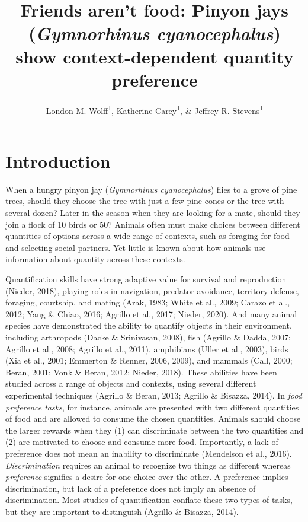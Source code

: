\documentclass[
  ,pub,floatsintext]{apa6}
\title{Friends aren't food: Pinyon jays (\emph{Gymnorhinus cyanocephalus}) show context-dependent quantity preference}
\author{London M. Wolff\textsuperscript{1}, Katherine Carey\textsuperscript{1}, \& Jeffrey R. Stevens\textsuperscript{1}}
\date{}
\affiliation{\vspace{0.5cm}\textsuperscript{1} Department of Psychology, Center for Brain, Biology \& Behavior, University of Nebraska-Lincoln, Lincoln, NE, USA}
\begin{document}
\maketitle

\hypertarget{introduction}{%
\section{Introduction}\label{introduction}}

When a hungry pinyon jay (\emph{Gymnorhinus cyanocephalus}) flies to a grove of pine trees, should they choose the tree with just a few pine cones or the tree with several dozen? Later in the season when they are looking for a mate, should they join a flock of 10 birds or 50? Animals often must make choices between different quantities of options across a wide range of contexts, such as foraging for food and selecting social partners. Yet little is known about how animals use information about quantity across these contexts.

Quantification skills have strong adaptive value for survival and reproduction (Nieder, 2018), playing roles in navigation, predator avoidance, territory defense, foraging, courtship, and mating (Arak, 1983; White et al., 2009; Carazo et al., 2012; Yang \& Chiao, 2016; Agrillo et al., 2017; Nieder, 2020). And many animal species have demonstrated the ability to quantify objects in their environment, including arthropods (Dacke \& Srinivasan, 2008), fish (Agrillo \& Dadda, 2007; Agrillo et al., 2008; Agrillo et al., 2011), amphibians (Uller et al., 2003), birds (Xia et al., 2001; Emmerton \& Renner, 2006, 2009), and mammals (Call, 2000; Beran, 2001; Vonk \& Beran, 2012; Nieder, 2018). These abilities have been studied across a range of objects and contexts, using several different experimental techniques (Agrillo \& Beran, 2013; Agrillo \& Bisazza, 2014). In \emph{food preference tasks}, for instance, animals are presented with two different quantities of food and are allowed to consume the chosen quantities. Animals should choose the larger rewards when they (1) can discriminate between the two quantities and (2) are motivated to choose and consume more food. Importantly, a lack of preference does not mean an inability to discriminate (Mendelson et al., 2016). \emph{Discrimination} requires an animal to recognize two things as different whereas \emph{preference} signifies a desire for one choice over the other. A preference implies discrimination, but lack of a preference does not imply an absence of discrimination. Most studies of quantification conflate these two types of tasks, but they are important to distinguish (Agrillo \& Bisazza, 2014).
\end{document}
